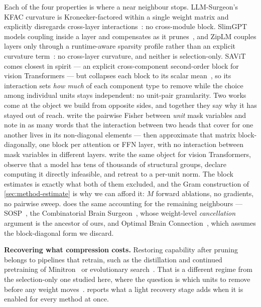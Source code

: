 Each of the four properties is where a near neighbour stops. LLM-Surgeon's KFAC curvature is
Kronecker-factored within a single weight matrix and explicitly disregards cross-layer
interactions~\citep{vanderouderaa2024llmsurgeon}: no cross-module block. SlimGPT models coupling inside
a layer and compensates as it prunes~\citep{ling2024slimgpt}, and ZipLM couples layers only through a
runtime-aware sparsity profile rather than an explicit curvature term~\citep{kurtic2023ziplm}: no
cross-layer curvature, and neither is selection-only. SAViT comes closest in spirit --- an explicit
cross-component second-order block for vision Transformers --- but collapses each block to its scalar
mean~\citep{zheng2022savit}, so its interaction sets \emph{how much} of each component type to remove
while the choice among individual units stays independent: no unit-pair granularity. Two works come at the object we build from
opposite sides, and together they say why it has stayed out of reach. \citet{kwon2022fastpruning} write
the pairwise Fisher between \emph{unit} mask variables and note in as many words that the interaction
between two heads that cover for one another lives in its non-diagonal elements --- then approximate that
matrix block-diagonally, one block per attention or FFN layer, with no interaction between mask variables
in different layers. \citet{yang2023nvit} write the same object for vision Transformers, observe that a
model has tens of thousands of structural groups, declare computing it directly infeasible, and retreat
to a per-unit norm. The block \method estimates is exactly what both of them excluded, and the Gram
construction of \cref{sec:method-estimate} is why we can afford it: $M$ forward ablations, no gradients, no
pairwise sweep.  does the same accounting for the remaining neighbours ---
SOSP~\citep{nonnenmacher2022sosp}, the Combinatorial Brain Surgeon~\citep{yu2022cbs}, whose
weight-level \emph{cancellation} argument is the ancestor of ours, and Optimal Brain
Connection~\citep{obc2025}, which assumes the block-diagonal form we discard.

\textbf{Recovering what compression costs.} Restoring capability after pruning belongs to pipelines
that retrain, such as the distillation and continued pretraining of
Minitron~\citep{muralidharan2024minitron} or evolutionary search~\citep{tang2025darwinlm}. That is a
different regime from the selection-only one studied here, where the question is which units to remove
before any weight moves~\citep{jaiswal2024kick}.  reports what a light recovery
stage adds when it is enabled for every method at once.

